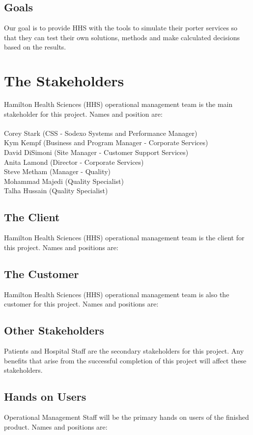 \documentclass[paper=letter, fontsize=10pt]{scrartcl}
\numberwithin{equation}{section}		%
\numberwithin{figure}{section}			%
\numberwithin{table}{section}				%
\begin{document}
\subsection{Goals}
Our goal is to provide HHS with the tools to simulate their porter services so that they can test their own solutions, methods and make calculated decisions based on the results.

\section{The Stakeholders}
Hamilton Health Sciences (HHS) operational management team is the main stakeholder for this project. Names and position are:\\ \\
Corey Stark (CSS - Sodexo Systems and Performance Manager)\\
Kym Kempf (Business and Program Manager - Corporate Services)\\
David DiSimoni (Site Manager - Customer Support Services)\\
Anita Lamond (Director - Corporate Services)\\
Steve Metham (Manager - Quality)\\
Mohammad Majedi (Quality Specialist)\\
Talha Hussain (Quality Specialist)

\subsection{The Client}
Hamilton Health Sciences (HHS) operational management team is the client for this project. Names and positions are:
\subsection{The Customer}
Hamilton Health Sciences (HHS) operational management team is also the customer for this project. Names and positions are:
\subsection{Other Stakeholders}
Patients and Hospital Staff are the secondary stakeholders for this project. Any benefits that arise from the successful completion of this project will affect these stakeholders.
\subsection{Hands on Users}
Operational Management Staff will be the primary hands on users of the finished product. Names and positions are:
\end{document}
